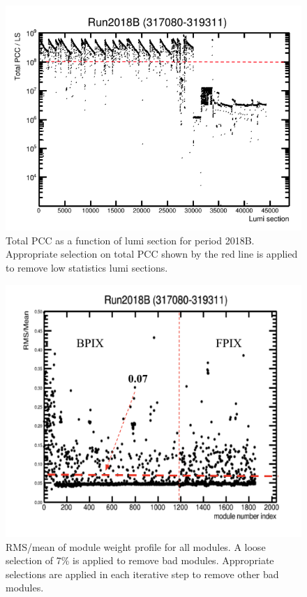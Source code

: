 \begin{figure}[!htp]
\centering
\includegraphics[width=1\textwidth]{ashish_thesis/Run2018B_totalPCC_cut.png}
\caption[Selection to remove low statistics lumi sections]{%
 Total PCC as a function of lumi section for period 2018B.  Appropriate selection on total PCC shown by the red line is applied to remove low statistics lumi sections.
}
\label{fig:PCC_cut}
\end{figure}




\begin{figure}[!htp]
\centering
\includegraphics[width=1\textwidth]{ashish_thesis/cut_selection.png}
\caption[First iteration to remove outlier modules]{%
   RMS/mean of module weight profile for all modules. A loose selection of 7\% is applied to remove bad modules. Appropriate selections are applied in each iterative step to remove other bad modules.
}
\label{fig:outliermodules}
\end{figure}

